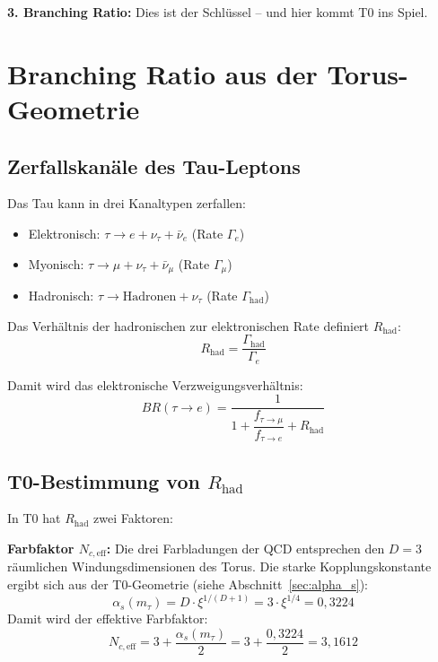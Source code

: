 	\textbf{3. Branching Ratio:} Dies ist der Schlüssel -- und hier kommt T0 ins Spiel.
	
	
	\section{Branching Ratio aus der Torus-Geometrie}
	
	\subsection{Zerfallskanäle des Tau-Leptons}
	
	Das Tau kann in drei Kanaltypen zerfallen:
	\begin{itemize}
		\item Elektronisch: $\tau \to e + \nu_\tau + \bar\nu_e$ (Rate $\Gamma_e$)
		\item Myonisch: $\tau \to \mu + \nu_\tau + \bar\nu_\mu$ (Rate $\Gamma_\mu$)
		\item Hadronisch: $\tau \to \text{Hadronen} + \nu_\tau$ (Rate $\Gamma_\text{had}$)
	\end{itemize}
	
	Das Verhältnis der hadronischen zur elektronischen Rate definiert $R_\text{had}$:
	\begin{equation}
		R_\text{had} = \frac{\Gamma_\text{had}}{\Gamma_e}
	\end{equation}
	
	Damit wird das elektronische Verzweigungsverhältnis:
	\begin{equation}
		BR(\tau \to e) = \frac{1}{1 + \dfrac{f_{\tau \to \mu}}{f_{\tau \to e}} + R_\text{had}}
		\label{eq:br}
	\end{equation}
	
	\subsection{T0-Bestimmung von $R_\text{had}$}
	
	In T0 hat $R_\text{had}$ zwei Faktoren:
	
	\textbf{Farbfaktor $N_{c,\text{eff}}$:} Die drei Farbladungen der QCD entsprechen den $D = 3$ räumlichen Windungsdimensionen des Torus. Die starke Kopplungskonstante ergibt sich aus der T0-Geometrie (siehe Abschnitt~\ref{sec:alpha_s}):
	\begin{equation}
		\alpha_s(m_\tau) = D \cdot \xi^{1/(D+1)} = 3 \cdot \xi^{1/4} = 0{,}3224
	\end{equation}
	Damit wird der effektive Farbfaktor:
	\begin{equation}
		N_{c,\text{eff}} = 3 + \frac{\alpha_s(m_\tau)}{2} = 3 + \frac{0{,}3224}{2} = 3{,}1612
	\end{equation}
	
